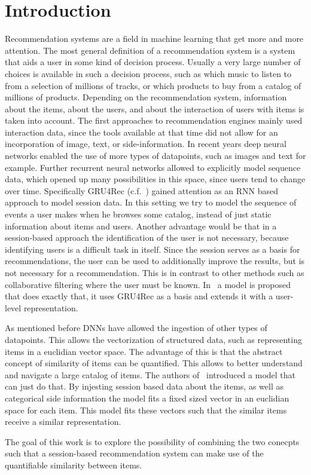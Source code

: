 \chapter{Introduction}
Recommendation systems are a field in machine learning that get more and more attention.
The most general definition of a recommendation system is a system that aids a user in some kind of decision process.
Usually a very large number of choices is available in such a decision process, such as which music to listen to from a selection of millions of tracks, or which products to buy from a catalog of millions of products.
Depending on the recommendation system, information about the items, about the users, and about the interaction of users with items is taken into account.
The first approaches to recommendation engines mainly used interaction data, since the tools available at that time did not allow for an incorporation of image, text, or side-information.
In recent years deep neural networks enabled the use of more types of datapoints, such as images and text for example.
Further recurrent neural networks allowed to explicitly model sequence data, which opened up many possibilities in this space, since users tend to change over time.
Specifically GRU4Rec (c.f.~\cite{gru4rec}) gained attention as an RNN based approach to model session data.
In this setting we try to model the sequence of events a user makes when he browses some catalog, instead of just static information about items and users.
Another advantage would be that in a session-based approach the identification of the user is not necessary, because identifying users is a difficult task in itself.
Since the session serves as a basis for recommendations, the user can be used to additionally improve the results, but is not necessary for a recommendation.
This is in contrast to other methods such as collaborative filtering where the user must be known.
In~\cite{hierarchical} a model is proposed that does exactly that, it uses GRU4Rec as a basis and extends it with a user-level representation.
\par
As mentioned before DNNs have allowed the ingestion of other types of datapoints.
This allows the vectorization of structured data, such as representing items in a euclidian vector space.
The advantage of this is that the abstract concept of similarity of items can be quantified.
This allows to better understand and navigate a large catalog of items.
The authors of~\cite{meta_prod2vec} introduced a model that can just do that.
By injesting session based data about the items, as well as categorical side information the model fits a fixed sized vector in an euclidian space for each item.
This model fits these vectors such that the similar items receive a similar representation.
\par
The goal of this work is to explore the possibility of combining the two conecpts such that a session-based recommendation system can make use of the quantifiable similarity between items.